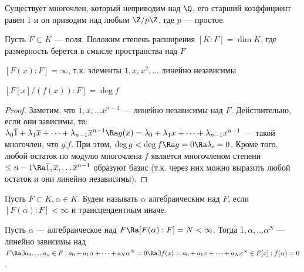 \begin{problem}
    Существует многочлен, который неприводим над \(\Q\), его старший коэффициент равен 1 и он приводим над любым \(\Z/p\Z\), где \(p\) --- простое.
\end{problem}

\begin{definition}
    Пусть \(F \subset K\) --- поля. Положим степень расширения \([K:F] = \dim K\), где размерность берется в смысле пространства над \(F\)
\end{definition}

\begin{example}
    \item \([F(x):F] = \infty\), т.к. элементы \(1, x, x^2, \dots\) линейно независимы
\end{example}

\begin{example}
    \item \([F[x]/(f(x)):F] = \deg f\)
\end{example}
\begin{proof}
    Заметим, что \(\overline{1}, \overline{x}, \dots \overline{x}^{n - 1}\) --- линейно независимы над \(F\). Действительно, если они зависимы, то: \(\lambda_0\overline{1} + \lambda_1\overline{x} + \dots + \lambda_{n - 1}\overline{x}^{n - 1} \Ra g(x) = \lambda_0 + \lambda_1x + \dots + \lambda_{n - 1}x^{n - 1}\) --- такой многочлен, что \(g \vdots f\). При этом, \(\deg g < \deg f \Ra g = 0 \Ra \lambda_i = 0\). Кроме того, любой остаток по модулю многочлена \(f\) является многочленом степени \(\le n - 1 \Ra \overline{1}, \overline{x}, \dots \overline{x}^{n - 1}\) образуют базис (т.к. через них можно выразить любой остаток и они линейно независимы).
\end{proof}

\begin{definition}
    Пусть \(F \subset K, \alpha \in K\). Будем называть \(\alpha\) алгебраическим над \(F\), если \([F(\alpha):F] < \infty\) и трансцендентным иначе.
\end{definition}

\begin{note}
    Пусть \(\alpha\) --- алгебраическое над \(F \Ra [F(\alpha):F] = N < \infty\). Тогда \(1, \alpha, \dots \alpha^N\) --- линейно зависимы над \(F \Ra \exists a_0, \dots a_n \in F: a_0 + a_1\alpha + \dots + a_N\alpha^N = 0 \Ra \exists f(x) = a_0 + a_1x + \dots + a_Nx^N \in F[x]: f(\alpha) = 0\).
\end{note}

